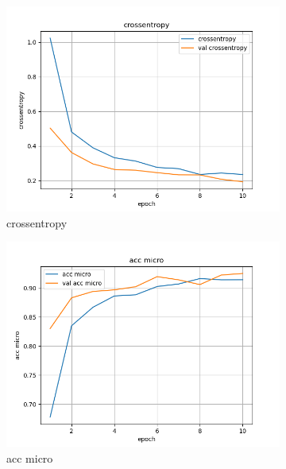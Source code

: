 \documentclass[a4paper]{article}
\begin{document}
\begin{figure}[ht]
    \centering
    \begin{subfigure}{0.32\textwidth}
        \centering
        \includegraphics[width=\linewidth]{../logs/resnet_img256_0/crossentropy.png}
        \caption{crossentropy}
    \end{subfigure}
    \begin{subfigure}{0.32\textwidth}
        \centering
        \includegraphics[width=\linewidth]{../logs/resnet_img256_0/acc micro.png}
        \caption{acc micro}
    \end{subfigure}
    \begin{subfigure}{0.32\textwidth}
        \centering

\end{subfigure}
\end{figure}
\end{document}
